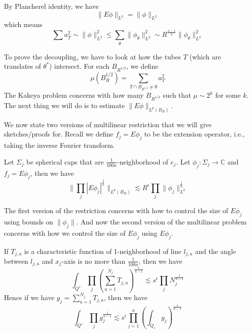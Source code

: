 By Plancherel identity, we have
\begin{equation*}
    \|E\phi\|_{L^2}=\|\phi\|_{L^2}
\end{equation*}
which means
\begin{equation*}
    \sum a_T^2\sim\|\phi\|_{L^2}^2\leq\sum_\theta\|\phi_\theta\|_{L^2}^2\sim R^{\frac{n-1}{2}}\|\phi_\theta\|_{L^2}^2
\end{equation*}

To prove the decoupling, we have to look at how the tubes $T$ (which are translates of $\theta^*$) intersect. For each $B_{R^{1/2}}$, we define
\begin{equation*}
    \mu(B_R^{1/2})=\sum_{T\cap B_{R^{1/2}}\neq\emptyset}a_T^2
\end{equation*}
The Kakeya problem concerns with how many $B_{R^{1/2}}$ such that $\mu\sim 2^k$ for some $k$. The next thing we will do is to estimate $\|E\phi\|_{L^p(B_R)}$.

We now state two versions of multilinear restriction that we will give sketches/proofs for. Recall we define $f_j=E\phi_j$ to be the extension operator, i.e., taking the inverse Fourier transform.
\begin{theorem}
    Let $\Sigma_j$ be spherical caps that are $\frac{1}{100n}$-neighborhood of $e_j$. Let $\phi_j:\Sigma_j\to\mathbb{C}$ and $f_j=E\phi_j$, then we have
    \begin{equation*}
        \|\prod_j|E\phi_j|^{\frac{1}{n}} \|_{L^p(B_R)}\lesssim R^\epsilon\prod_j\|\phi_j\|_{L^2}^{\frac{1}{n}}
    \end{equation*}
\end{theorem}
The first version of the restriction concerns with how to control the size of $E\phi_j$ using bounds on $\|\phi_j\|$. And now the second version of the multilinear problem concerns with how we control the size of $E\phi_j$ using $E\phi_j$.

\begin{theorem}
    If $T_{j,a}$ is a characteristic function of 1-neighborhood of line $l_{j,a}$ and the angle between $l_{j,a}$ and $x_j$-axis is no more than $\frac{1}{100n}$, then we have
    \begin{equation*}
        \int_{Q^s}\prod_j\left(\sum_{a=1}^{N_j}T_{j,a} \right)^{\frac{1}{n-1}}\lesssim s^\epsilon\prod_jN_j^{\frac{1}{n-1}}
    \end{equation*}
    Hence if we have $g_j=\sum_{a=1}^{N_j}T_{j,a}$, then we have
    \begin{equation*}
        \int_{Q^s}\prod_jg_j^{\frac{1}{n-1}}\lesssim s^\epsilon\prod_{j=1}^n\left(\int_{Q_s}g_j\right)^{\frac{1}{n-1}}
    \end{equation*}
\end{theorem}


